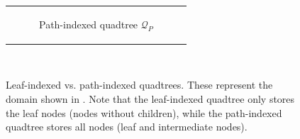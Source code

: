 \begin{figure}
\begin{tabular}{c}
\begin{subfigure}[t]{0.8\textwidth}
            \caption{Path-indexed quadtree $\mathcal{Q}_P$}
            \label{subfig:path-indexed-quadtree-serial}
        \end{subfigure}
    \end{tabular}\\
    \caption{Leaf-indexed vs. path-indexed quadtrees. These represent the domain shown in . Note that the leaf-indexed quadtree only stores the leaf nodes (nodes without children), while the path-indexed quadtree stores all nodes (leaf and intermediate nodes).}
    \label{fig:quadtree-indexing-serial}
\end{figure}

